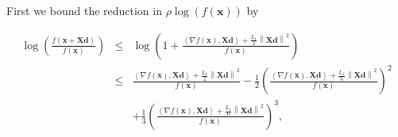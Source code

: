 \documentclass{article}
\newcommand{\x}{\mathbf{x}}
\newcommand{\0}{\textbf{0}}
\newcommand{\n}{\nabla}
\newcommand{\X}{\mathbf{X}}
\newcommand{\tmd}{\mathbf{d}}
\begin{document}
First we bound the reduction in $\rho \log \left( f \left( \x \right) \right)$
by


\begin{eqnarray*}
  \log \left( \frac{f \left( \x + \X \tmd \right)}{f \left( \x \right)}
  \right) & \leq & \log \left( 1 + \frac{\left\langle \n f \left( \x \right),
  \X \tmd \right\rangle + \frac{L_1}{2} \left\| \X \tmd \right\|^2}{f \left(
  \x \right)} \right)\\
  & \leq & \frac{\left\langle \n f \left( \x \right), \X \tmd \right\rangle +
  \frac{L_1}{2} \left\| \X \tmd \right\|^2}{f \left( \x \right)} - \frac{1}{2}
  \left( \frac{\left\langle \n f \left( \x \right), \X \tmd \right\rangle +
  \frac{L_1}{6} \left\| \X \tmd \right\|^2}{f \left( \x \right)} \right)^2\\
  &  & + \frac{1}{3} \left( \frac{\left\langle \n f \left( \x \right), \X
  \tmd \right\rangle + \frac{L_1}{6} \left\| \X \tmd \right\|^2}{f \left( \x
  \right)} \right)^3,
\end{eqnarray*}
\end{document}
